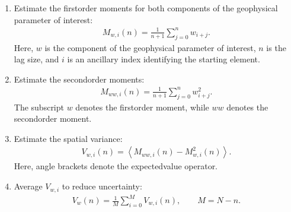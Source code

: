 \documentclass[a4paper,10pt,english]{sphinxmanual}
\begin{document}
\sphinxAtStartPar
{}
\begin{enumerate}
%
\item {} 
\sphinxAtStartPar
Estimate the first\sphinxhyphen{}order moments for both components of the geophysical
parameter of interest:
\begin{equation}\label{equation:alg-02-validation:eq-cvtdd-spatial-first-moment}
\begin{split}M_{w,i}(n)
= \frac{1}{n+1}\sum_{j=0}^{n}w_{i+j} .\end{split}
\end{equation}
\sphinxAtStartPar
Here, \(w\) is the component of the geophysical parameter of interest,
\(n\) is the lag size, and \(i\) is an ancillary index identifying
the starting element.

\item {} 
\sphinxAtStartPar
Estimate the second\sphinxhyphen{}order moments:
\begin{equation}\label{equation:alg-02-validation:eq-cvtdd-spatial-second-moment}
\begin{split}M_{ww,i}(n)
= \frac{1}{n+1}\sum_{j=0}^{n}w^{2}_{i+j} .\end{split}
\end{equation}
\sphinxAtStartPar
The subscript \(w\) denotes the first\sphinxhyphen{}order moment, while \(ww\)
denotes the second\sphinxhyphen{}order moment.

\item {} 
\sphinxAtStartPar
Estimate the spatial variance:
\begin{equation}\label{equation:alg-02-validation:eq-cvtdd-local-spatial-variance}
\begin{split}V_{w,i}(n)
= \left\langle M_{ww,i}(n)-M_{w,i}^{2}(n)\right\rangle .\end{split}
\end{equation}
\sphinxAtStartPar
Here, angle brackets denote the expected\sphinxhyphen{}value operator.

\item {} 
\sphinxAtStartPar
Average \(V_{w,i}\) to reduce uncertainty:
\begin{equation}\label{equation:alg-02-validation:eq-cvtdd-average-spatial-variance}
\begin{split}V_w(n)=\frac{1}{M}\sum_{i=0}^{M}V_{w,i}(n),
\qquad M=N-n .\end{split}
\end{equation}
\end{enumerate}
\end{document}
